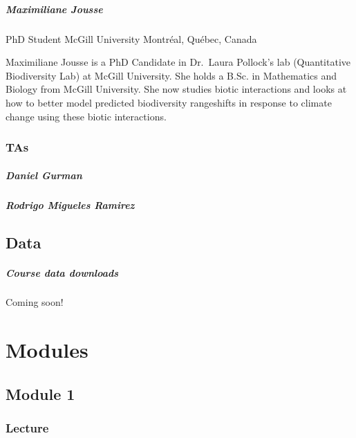\documentclass[
]{book}
\begin{document}
\subsubsection{Maximiliane Jousse}\label{maximiliane-jousse}

PhD Student
McGill University
Montréal, Québec, Canada

Maximiliane Jousse is a PhD Candidate in Dr.~Laura Pollock's lab (Quantitative Biodiversity Lab) at McGill University. She holds a B.Sc. in Mathematics and Biology from McGill University. She now studies biotic interactions and looks at how to better model predicted biodiversity rangeshifts in response to climate change using these biotic interactions.

\section{TAs}\label{tas}

\subsubsection{Daniel Gurman}\label{daniel-gurman}

\subsubsection{Rodrigo Migueles Ramirez}\label{rodrigo-migueles-ramirez}

\chapter{Data}\label{data}

\subsubsection{Course data downloads}\label{course-data-downloads}

Coming soon!

\part{Modules}\label{part-modules}

\chapter{Module 1}\label{module-1}

\section{Lecture}\label{lecture}
\end{document}
